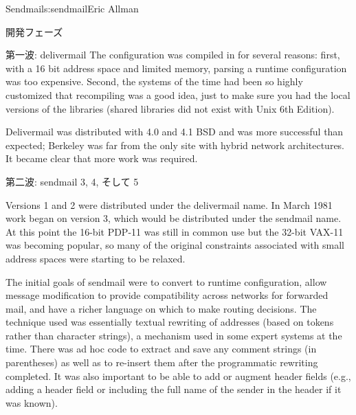 \begin{aosachapter}{Sendmail}{s:sendmail}{Eric Allman}
\begin{aosasect1}{開発フェーズ}
\begin{aosasect2}{第一波: delivermail}
The configuration was compiled in for several reasons: first, with a
16 bit address space and limited memory, parsing a runtime
configuration was too expensive. Second, the systems of the time had
been so highly customized that recompiling was a good idea, just to
make sure you had the local versions of the libraries (shared
libraries did not exist with Unix 6th Edition).

Delivermail was distributed with 4.0 and 4.1 BSD and was more
successful than expected; Berkeley was far from the only site with
hybrid network architectures.  It became clear that more work was
required.

\end{aosasect2}

\begin{aosasect2}{第二波: sendmail 3, 4, そして 5}

Versions 1 and 2 were distributed under the delivermail name. In March
1981 work began on version 3, which would be distributed under the
sendmail name. At this point the 16-bit PDP-11 was still in common use
but the 32-bit VAX-11 was becoming popular, so many of the original
constraints associated with small address spaces were starting to be
relaxed.

The initial goals of sendmail were to convert to runtime
configuration, allow message modification to provide compatibility
across networks for forwarded mail, and have a richer language on
which to make routing decisions. The technique used was essentially
textual rewriting of addresses (based on tokens rather than
character strings),
a mechanism used in some expert systems at the time. There was ad hoc
code to extract and save any comment strings (in parentheses) as well
as to re-insert them after the programmatic rewriting completed. It
was also important to be able to add or augment header fields (e.g.,
adding a  header field or including the full name of the
sender in the  header if it was known).


\end{aosasect2}
\end{aosasect1}
\end{aosachapter}
